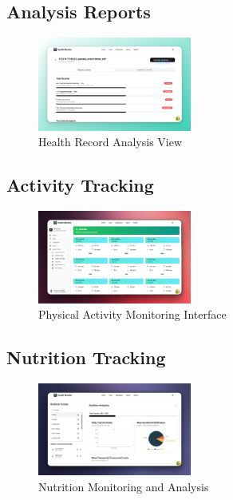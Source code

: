 \subsection{Analysis Reports}
\begin{figure}[H]
    \centering
    \includegraphics[width=0.45\textwidth]{public/landing/hm-record-analysis.png}
    \caption{Health Record Analysis View}
\end{figure}

\subsection{Activity Tracking}
\begin{figure}[H]
    \centering
    \includegraphics[width=0.45\textwidth]{public/landing/hm-activities.png}
    \caption{Physical Activity Monitoring Interface}
\end{figure}

\subsection{Nutrition Tracking}
\begin{figure}[H]
    \centering
    \includegraphics[width=0.45\textwidth]{public/landing/hm-nutrition.png}
    \caption{Nutrition Monitoring and Analysis}
\end{figure}

